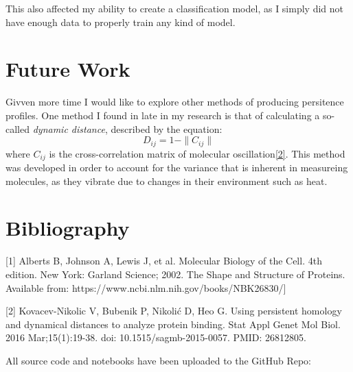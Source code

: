 \documentclass[12pt]{article}
\begin{document}
        This also affected my ability to create a classification model, as I simply did not have enough data to properly train any kind of model.


    \section{Future Work}
        \label{sec:future}
        Givven more time I would like to explore other methods of producing persitence profiles. One method I found in late in my research is that 
        of calculating a so-called \emph{dynamic distance}, described by the equation:
        $$
        D_{ij}=1-\|C_{ij}\|
        $$
        where $C_{ij}$ is the cross-correlation matrix of molecular oscillation\hyperref[itm:2]{[2]}. This method was developed in order to
        account for the variance that is inherent in measureing molecules, as they vibrate due to changes in their environment such as heat.

    \section*{Bibliography}

        \label{itm:1}
        [1] Alberts B, Johnson A, Lewis J, et al. Molecular Biology of the Cell. 4th edition. 
        New York: Garland Science; 2002. The Shape and Structure of Proteins. 
        Available from: https://www.ncbi.nlm.nih.gov/books/NBK26830/]

        \label{itm:2}
        [2] Kovacev-Nikolic V, Bubenik P, Nikolić D, Heo G. Using persistent homology and dynamical 
        distances to analyze protein binding. Stat Appl Genet Mol Biol. 2016 Mar;15(1):19-38. 
        doi: 10.1515/sagmb-2015-0057. PMID: 26812805.

        \label{itm:3}
        All source code and notebooks have been uploaded to the GitHub Repo:
        
\end{document}
